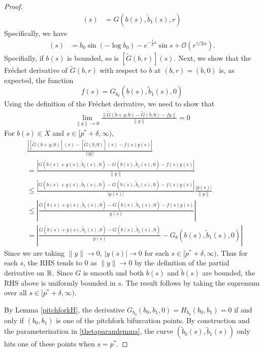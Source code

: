 \documentclass[thesis.tex]{subfiles}
\begin{document}
\begin{lemma}
\begin{proof}
\begin{align*}
[\tilde{G}(b, r)](s) &= G(b(s), \tilde{b}_1(s), r)
\end{align*}
Specifically, we have
\begin{align*}
[\tilde{G}(b, r)](s) &= b_0 \sin(-\log b_0) - e^{-\frac{1}{\rho}s} \sin s + \mathcal{O}(r^{\gamma/2\alpha}).
\end{align*}
Specifially, if $b(s)$ is bounded, so is $[\tilde{G}(b, r)](s)$. Next, we show that the Fr\'echet derivative of $\tilde{G}(b,r)$ with respect to $b$ at $(b, r) = (b, 0)$ is, as expected, the function 
\begin{equation}
f(s) = G_{b_0}(b(s), \tilde{b}_1(s), 0) 
\end{equation}
Using the definition of the Fr\'echet derivative, we need to show that
\begin{align}
\lim_{\|y\| \rightarrow 0} \frac{\| \tilde{G}(b + y, 0) - \tilde{G}(b, 0) - fy\|}{\|y\|} = 0
\end{align}
For $b(s) \in X$ and $s \in [p^* + \delta, \infty)$,
\begin{align*}
&\frac{ \left| [\tilde{G}(b + y, 0)](s) - [\tilde{G}(b, 0)](s) - f(s) y(s) \right| }{||y||} \\
&=\frac{ \left| G(b(s) + y(s), \tilde{b}_1(s), 0) - G(b(s), \tilde{b}_1(s), 0) - f(s) y(s) \right| }{\|y\|} \\
&\leq \frac{\left| G(b(s) + y(s), \tilde{b}_1(s), 0) - G(b(s), \tilde{b}_1(s), 0) - f(s) y(s)\right|}{|y(s)|} \frac{|y(s)|}{\|y\|} \\
&\leq \left| \frac{ G(b(s) + y(s), \tilde{b}_1(s), 0) - G(b(s), \tilde{b}_1(s), 0) - f(s) y(s)}{y(s)} \right| \\
&= \left| \frac{ G(b(s) + y(s), \tilde{b}_1(s), 0) - G(b(s), \tilde{b}_1(s), 0)}{y(s)} - G_{b}(b(s), \tilde{b}_1(s), 0) \right|
\end{align*}
Since we are taking $\|y\| \rightarrow 0$, $|y(s)| \rightarrow 0$ for each $s \in [p^* + \delta, \infty)$. Thus for each $s$, the RHS tends to 0 as $\|y\| \rightarrow 0$ by the definition of the partial derivative on $\mathbb{R}$. Since $G$ is smooth and both $b(s)$ and $\tilde{b}(s)$ are bounded, the RHS above is uniformly bounded in $s$. The result follows by taking the supremum over all $s \in [p^* + \delta, \infty)$.

By Lemma \ref{pitchforkH}, the derivative $G_{b_0}(b_0, b_1, 0) = H_{b_0}(b_0, b_1) = 0$ if and only if $(b_0, b_1)$ is one of the pitchfork bifurcation points. By construction and the parameterization in \cref{thetaparamlemma}, the curve $(\tilde{b}_0(s), \tilde{b}_1(s))$ only hits one of these points when $s = p^*$. 


\end{proof}
\end{lemma}
\end{document}
